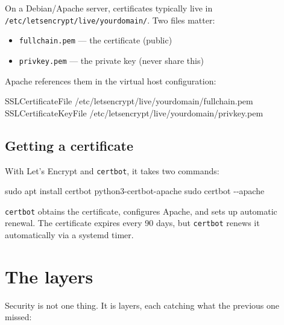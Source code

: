 \documentclass[11pt,a4paper,oneside]{book}
\newenvironment{Shaded}{\begin{snugshade}}{\end{snugshade}}
\newcommand{\StringTok}[1]{\textcolor[HTML]{4070A0}{#1}}
\newcommand{\FunctionTok}[1]{\textcolor[HTML]{06287E}{#1}}
\newcommand{\AttributeTok}[1]{\textcolor[HTML]{7D9029}{#1}}
\newcommand{\NormalTok}[1]{#1}
\providecommand{\tightlist}{%
  \setlength{\itemsep}{0pt}\setlength{\parskip}{0pt}}
\begin{document}
On a Debian/Apache server, certificates typically live in
\texttt{/etc/letsencrypt/live/yourdomain/}. Two files matter:

\begin{itemize}
\tightlist
\item
  \texttt{fullchain.pem} --- the certificate (public)
\item
  \texttt{privkey.pem} --- the private key (never share this)
\end{itemize}

Apache references them in the virtual host configuration:

\begin{Shaded}
\begin{Highlighting}[]
\NormalTok{SSLCertificateFile}\StringTok{ /etc/letsencrypt/live/yourdomain/fullchain.pem}
\NormalTok{SSLCertificateKeyFile}\StringTok{ /etc/letsencrypt/live/yourdomain/privkey.pem}
\end{Highlighting}
\end{Shaded}

\hypertarget{getting-a-certificate}{%
\subsection{Getting a certificate}\label{getting-a-certificate}}

With Let's Encrypt and \texttt{certbot}, it takes two commands:

\begin{Shaded}
\begin{Highlighting}[]
\FunctionTok{sudo}\NormalTok{ apt install certbot python3{-}certbot{-}apache}
\FunctionTok{sudo}\NormalTok{ certbot }\AttributeTok{{-}{-}apache}
\end{Highlighting}
\end{Shaded}

\texttt{certbot} obtains the certificate, configures Apache, and
sets up automatic renewal. The certificate expires every 90 days,
but \texttt{certbot} renews it automatically via a systemd timer.

\hypertarget{the-layers}{%
\section{The layers}\label{the-layers}}

Security is not one thing. It is layers, each catching what the
previous one missed:
\end{document}
